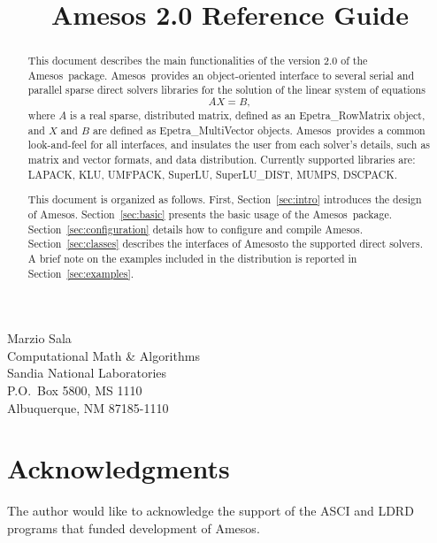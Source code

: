 \documentclass[11pt]{SANDreport}
\title{Amesos 2.0 Reference Guide}
\newcommand{\amesos}{{\sc Amesos}}
\begin{document}
\maketitle

\begin{center}
Marzio  Sala \\
Computational Math \& Algorithms \\
Sandia National Laboratories\\
P.O.~Box 5800, MS 1110 \\
Albuquerque, NM 87185-1110
\end{center}

\vspace{20pt}

\begin{abstract}
  This document describes the main functionalities of the version 2.0 of the
  \amesos\ package. \amesos\ provides an
  object-oriented interface to several serial and parallel sparse direct
  solvers libraries for the solution of the linear system of equations
  \begin{equation}
    \label{eq:linear_system}
    A X = B,
  \end{equation}
  where $A$ is a real sparse, distributed matrix, defined as an
  Epetra\_RowMatrix object, and $X$ and $B$ are defined as
  Epetra\_MultiVector objects.   \amesos\ provides a common look-and-feel
  for all interfaces, and insulates the user from each solver's details, such as matrix and
  vector formats, and data distribution. Currently supported libraries are:
  LAPACK, KLU, UMFPACK, SuperLU, SuperLU\_DIST, MUMPS, DSCPACK.
  
  \smallskip

  This document is organized as follows. First, Section~\ref{sec:intro}
  introduces the design of \amesos.  Section~\ref{sec:basic} presents
  the basic usage of the \amesos\ package. Section~\ref{sec:configuration}
  details how to configure and compile \amesos.
  Section~\ref{sec:classes} describes the interfaces of \amesos to the supported
  direct solvers. A brief note on
  the examples included in the distribution is reported in Section~\ref{sec:examples}.
\end{abstract}

\clearpage

\clearpage

\section*{Acknowledgments}
The author would like to acknowledge the support of the ASCI and LDRD programs
that funded development of \amesos.
\end{document}
